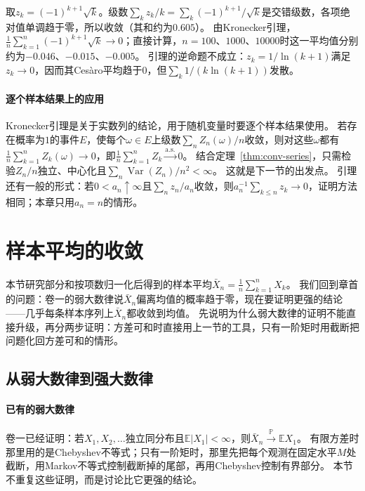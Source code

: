 \begin{example}[确定性数列上的Kronecker引理]
\label{ex:conv-kronecker-deterministic}
取$z_k=(-1)^{k+1}\sqrt k$。级数$\sum_kz_k/k=\sum_k(-1)^{k+1}/\sqrt k$是交错级数，各项绝对值单调趋于零，所以收敛（其和约为$0.605$）。
由Kronecker引理，$\frac1n\sum_{k=1}^n(-1)^{k+1}\sqrt k\to0$；直接计算，$n=100$、$1000$、$10000$时这一平均值分别约为$-0.046$、$-0.015$、$-0.005$。
引理的逆命题不成立：$z_k=1/\ln(k+1)$满足$z_k\to0$，因而其Cesàro平均趋于$0$，但$\sum_k1/(k\ln(k+1))$发散。
\end{example}

\paragraph{逐个样本结果上的应用}
Kronecker引理是关于实数列的结论，用于随机变量时要逐个样本结果使用。
若存在概率为$1$的事件$E$，使每个$\omega\in E$上级数$\sum_nZ_n(\omega)/n$收敛，则对这些$\omega$都有$\frac1n\sum_{k=1}^nZ_k(\omega)\to0$，即$\frac1n\sum_{k=1}^nZ_k\xrightarrow{\mathrm{a.s.}}0$。
结合定理~\ref{thm:conv-series}，只需检验$Z_n/n$独立、中心化且$\sum_n\operatorname{Var}(Z_n)/n^2<\infty$。
这就是下一节的出发点。
引理还有一般的形式：若$0<a_n\uparrow\infty$且$\sum_nz_n/a_n$收敛，则$a_n^{-1}\sum_{k\leq n}z_k\to0$，证明方法相同；本章只用$a_n=n$的情形。

\section{样本平均的收敛}
\label{sec:conv-sample-means}

本节研究部分和按项数归一化后得到的样本平均$\bar X_n=\frac1n\sum_{k=1}^nX_k$。
我们回到章首的问题：卷一的弱大数律说$\bar X_n$偏离均值的概率趋于零，现在要证明更强的结论——几乎每条样本序列上$\bar X_n$都收敛到均值。
先说明为什么弱大数律的证明不能直接升级，再分两步证明：方差可和时直接用上一节的工具，只有一阶矩时用截断把问题化回方差可和的情形。

\subsection{从弱大数律到强大数律}

\paragraph{已有的弱大数律}
卷一已经证明：若$X_1,X_2,\ldots$独立同分布且$\mathbb E|X_1|<\infty$，则$\bar X_n\xrightarrow{\mathbb P}\mathbb EX_1$。
有限方差时那里用的是Chebyshev不等式；只有一阶矩时，那里先把每个观测在固定水平$M$处截断，用Markov不等式控制截断掉的尾部，再用Chebyshev控制有界部分。
本节不重复这些证明，而是讨论比它更强的结论。

